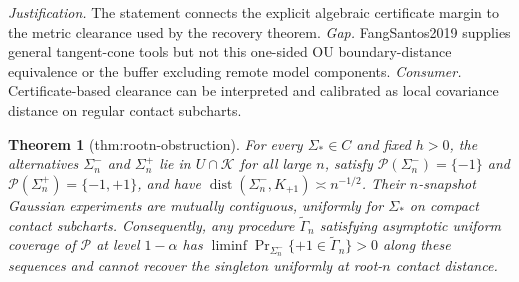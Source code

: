 \documentclass{article}
\newtheorem{theorem}{Theorem}
\begin{document}
\par\smallskip\noindent \textit{Justification.} The statement connects the explicit algebraic certificate margin to the metric clearance used by the recovery theorem. \textit{Gap.} FangSantos2019 supplies general tangent-cone tools but not this one-sided OU boundary-distance equivalence or the buffer excluding remote model components. \textit{Consumer.} Certificate-based clearance can be interpreted and calibrated as local covariance distance on regular contact subcharts.

\begin{theorem}[thm:rootn-obstruction]\label{thm:rootn-obstruction}
For every \(\Sigma_*\in C\) and fixed \(h>0\), the alternatives \(\Sigma_n^{-}\) and \(\Sigma_n^{+}\) lie in \(U\cap\mathcal K\) for all large \(n\), satisfy \(\mathcal P(\Sigma_n^{-})=\{-1\}\) and \(\mathcal P(\Sigma_n^{+})=\{-1,+1\}\), and have \(\operatorname{dist}(\Sigma_n^{-},K_{+1})\asymp n^{-1/2}\). Their \(n\)-snapshot Gaussian experiments are mutually contiguous, uniformly for \(\Sigma_*\) on compact contact subcharts. Consequently, any procedure \(\widetilde\Gamma_n\) satisfying asymptotic uniform coverage of \(\mathcal P\) at level \(1-\alpha\) has \(\liminf\Pr_{\Sigma_n^{-}}\{+1\in\widetilde\Gamma_n\}>0\) along these sequences and cannot recover the singleton uniformly at root-\(n\) contact distance.
\end{theorem}
\end{document}
